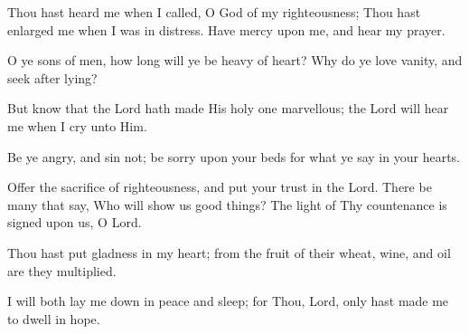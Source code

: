 Thou hast heard me when I called, O God of my righteousness; Thou hast enlarged me when I was in distress. Have mercy upon me, and hear my prayer.

O ye sons of men, how long will ye be heavy of heart? Why do ye love vanity, and seek after lying?

But know that the Lord hath made His holy one marvellous; the Lord will hear me when I cry unto Him.

Be ye angry, and sin not; be sorry upon your beds for what ye say in your hearts.

Offer the sacrifice of righteousness, and put your trust in the Lord. There be many that say, Who will show us good things? The light of Thy countenance is signed upon us, O Lord.

Thou hast put gladness in my heart; from the fruit of their wheat, wine, and oil are they multiplied.

I will both lay me down in peace and sleep; for Thou, Lord, only hast made me to dwell in hope.
